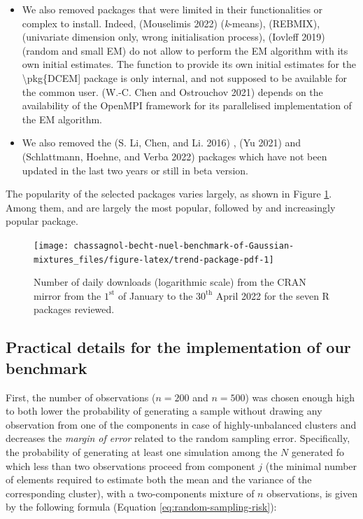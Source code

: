 \begin{itemize}
\item
  We also removed packages that were limited in their functionalities
  or complex to install. Indeed,  (Mouselimis 2022)
  (\emph{k}-means),  (REBMIX),  (univariate
  dimension only, wrong initialisation process), 
  (Iovleff 2019) (random and small EM) do not allow to perform the EM
  algorithm with its own initial estimates. The function to provide its own initial estimates for the \textbackslash pkg\{DCEM{]} package is only internal, and not supposed to be available for the common user.  (W.-C. Chen and Ostrouchov 2021) depends on
  the availability of the OpenMPI framework for its parallelised
  implementation of the EM algorithm.
\item
  We also removed the  (S. Li, Chen, and Li. 2016) ,
   (Yu 2021) and  (Schlattmann, Hoehne, and Verba 2022) packages
  which have not been updated in the last two years or still in beta
  version.
\end{itemize}

The popularity of the selected packages varies largely, as shown in
Figure
\ref{fig:trend-package-pdf}.
Among them,  and  are largely the most popular,
followed by  and increasingly popular 
package.

\begin{figure}

{\centering \texttt{[image: chassagnol-becht-nuel-benchmark-of-Gaussian-mixtures\_files/figure-latex/trend-package-pdf-1]} 

}

\caption{Number of daily downloads (logarithmic scale) from the CRAN mirror from the $1^\text{st}$ of January to the $30^{\text{th}}$ April 2022 for the seven R packages reviewed.}\label{fig:trend-package-pdf}
\end{figure}

\hypertarget{practical-details-for-the-implementation-of-our-benchmark}{%
\subsection{Practical details for the implementation of our benchmark}\label{practical-details-for-the-implementation-of-our-benchmark}}

First, the number of observations (\(n=200\) and \(n=500\)) was chosen enough high to both lower the probability of generating a sample without drawing any observation from one of the components in case of highly-unbalanced clusters and decreases the \emph{margin of error} related to the random sampling error. Specifically, the probability of generating at least one simulation among the \(N\) generated fo which less than two observations proceed from component \(j\) (the minimal number of elements required to estimate both the mean and the variance of the corresponding cluster), with a two-components mixture of \(n\) observations, is given by the following formula (Equation
\eqref{eq:random-sampling-risk}):

